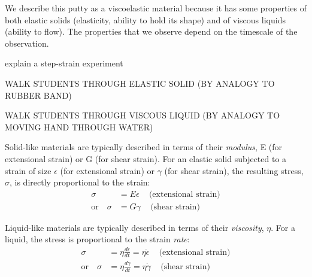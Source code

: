 \begin{activity}
\begin{ctqs}
\begin{solution}[1.5in]
				We describe this putty as a viscoelastic material because it  has some properties of both elastic solids (elasticity, ability to hold its shape) and of viscous liquids (ability to flow).  The properties that we observe depend on the timescale of the observation.
				
			\end{solution}
		
\end{ctqs}

\begin{model}

	explain a step-strain experiment
	
\end{model}

\begin{ctqs}
	\question WALK STUDENTS THROUGH ELASTIC SOLID (BY ANALOGY TO RUBBER BAND)
	
	\question  WALK STUDENTS THROUGH VISCOUS LIQUID (BY ANALOGY TO MOVING HAND THROUGH WATER)
	
\end{ctqs}

\begin{infobox}

	Solid-like materials are typically described in terms of their \emph{modulus}, E (for extensional strain) or G (for shear strain).  For an elastic solid subjected to a strain of size $\epsilon$ (for extensional strain) or $\gamma$ (for shear strain), the resulting stress, $\sigma$, is directly proportional to the strain:
	\begin{align*}
		\sigma &= E\epsilon\,\,\,\,\,\,\,\text{(extensional strain)}\\
		\text{or}\,\,\,\,\,\,\sigma &= G\gamma\,\,\,\,\,\,\,\text{(shear strain)}
	\end{align*}
	
	Liquid-like materials are typically described in terms of their \emph{viscosity}, $\eta$.  For a liquid, the stress is proportional to the strain \emph{rate}:
	\begin{align*}
		\sigma &= \eta\frac{d\epsilon}{dt}=\eta\dot\epsilon\,\,\,\,\,\,\,\text{(extensional strain)}\\
		\text{or}\,\,\,\,\,\,\sigma &= \eta\frac{d\gamma}{dt}=\eta\dot\gamma\,\,\,\,\,\,\,\text{(shear strain)}
	\end{align*}


\end{infobox}
\end{activity}
